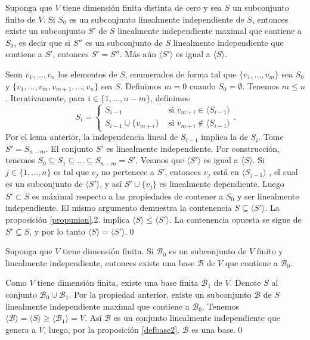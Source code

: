 \begin{prop}\label{maximallinind}
Suponga que $V$ tiene dimensi\'on finita distinta de cero y sea $S$ un subconjunto finito de $V$. Si $S_0$ es un subconjunto linealmente independiente de $S$, entonces existe un subconjunto $S'$ de $S$ linealmente independiente maximal que contiene a $S_0$, es decir que si $S''$ es un subconjunto de $S$ linealmente independiente que contiene a $S'$, entonces $S'=S''$. M\'as a\'un $\langle S'\rangle$ es igual a $\langle S\rangle$.  
\end{prop}

\dem Sean $v_1,\ldots,v_n$ los elementos de $S$, enumerados de forma tal que $\{v_1,\ldots,v_m\}$ sea $S_0$ y $\{v_1,\ldots,v_m,v_{m+1},\ldots,v_n\}$ sea $S$. Definimos $m=0$ cuando $S_0=\emptyset$. Tenemos $m\le n$. Iterativamente, para $i\in\{1,\ldots,n-m\}$, definimos
$$
S_i = \left\{ \begin{array}{rl}
S_{i-1}&\textrm{ si } v_{m+i}\in\langle S_{i-1}\rangle\\
S_{i-1}\cup\{v_{m+i}\} &\textrm{ si } v_{m+i}\not\in\langle S_{i-1}\rangle
\end{array}\right. .
$$
Por el lema anterior, la independencia lineal de $S_{i-1}$ implica la de $S_i$. Tome $S'=S_{n-m}$. El conjunto $S'$ es linealmente independiente. Por construcci\'on, tenemos $S_0\subseteq S_1\subseteq\ldots\subseteq S_{n-m}= S'$. Veamos que $\langle S'\rangle$ es igual a $\langle S\rangle$. Si $j\in\{1,\ldots,n\}$ es tal que $v_j$ no pertenece a $S'$, entonces $v_j$ est\'a en $\langle S_{j-1}\rangle$ , el cual es un subconjunto de $\langle S'\rangle$, y as\'i $S'\cup\{v_j\}$ es linealmente dependiente. Luego $S'\subset S$ es m\'aximal respecto a las propiedades de contener a $S_0$ y ser linealmente independiente. El mismo argumento demuestra la contenencia $S\subseteq\langle S'\rangle$. La proposici\'on \ref{propunion}.2. implica $\langle S\rangle\le\langle S'\rangle$. La contenencia opuesta se sigue de $S'\subseteq S$, y por lo tanto $\langle S\rangle=\langle S'\rangle$.\qed

\begin{teo}\label{extabase}
Suponga que $V$ tiene dimensi\'on finita. Si $\mathcal{B}_0$ es un subconjunto de $V$ finito y linealmente independiente, entonces existe una base $\mathcal{B}$ de $V$ que contiene a $\mathcal{B}_0$.
\end{teo}

\dem Como $V$ tiene dimensi\'on finita, existe una base finita $\mathcal{B}_1$ de $V$. Denote $S$ al conjunto $\mathcal{B}_0\cup \mathcal{B}_1$. Por la propiedad anterior, existe un subconjunto $\mathcal{B}$ de $S$ linealmente independiente maximal que contiene a $\mathcal{B}_0$. Tenemos $\langle \mathcal{B}\rangle=\langle S \rangle\ge\langle \mathcal{B}_1\rangle=V$. As\'i $\mathcal{B}$ es un conjunto linealmente independiente que genera a $V$, luego, por la proposici\'on \ref{defbase2}, $\mathcal{B}$ es una base.\qed

